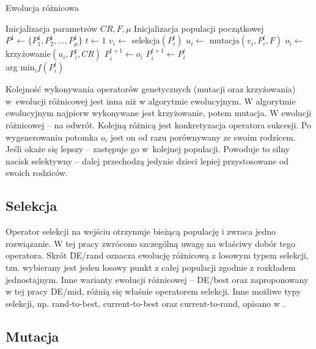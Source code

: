 \documentclass[a4paper,onecolumn,oneside,12pt,wide,floatssmall]{mwrep}
\theoremstyle{definition}
\theoremstyle{plain}%
\theoremstyle{remark}
\begin{document}
\begin{algorithm}[H]
\caption{Ewolucja różnicowa}
\label{algorithm:de}
\begin{algorithmic}[1]
\State Inicjalizacja parametrów $CR, F, \mu$
\State Inicjalizacja populacji początkowej $P^1 \gets \{P^1_1, P^1_2, \ldots, P^1_\mu\}$
\State $t \gets 1$
    \State $v_i \gets$ selekcja$(P^t_i)$
    \State $u_i \gets$ mutacja$(v_i, P^t_i, F)$ 
    \State $o_i \gets$ krzy{\.z}owanie$(u_i, P_i^t, CR)$    
        
      \State $P_i^{t+1} \gets o_i$     
    \Else 
      \State $P_i^{t+1} \gets P_i^{t}$
    \EndIf {}
  \EndFor
\EndWhile \\
\Return arg min$_i f(P^t_i)$ 
\end{algorithmic}
\end{algorithm}

Kolejność wykonywania operatorów genetycznych (mutacji oraz krzyżowania) w~ewolucji różnicowej
jest inna niż w algorytmie ewolucyjnym.
W algorytmie ewolucyjnym najpierw wykonywane jest krzyżowanie, potem mutacja.
W ewolucji różnicowej -- na odwrót.
Kolejną różnicą jest konkretyzacja operatora sukcesji. Po wygenerowaniu potomka
$o_i$ jest on od razu porównywany ze swoim rodzicem. Jeśli okaże się lepszy -- zastępuje go
w~kolejnej populacji. Powoduje to silny nacisk selektywny -- dalej przechodzą jedynie dzieci
lepiej przystosowane od swoich rodziców.

\subsection{Selekcja}

Operator selekcji na wejściu otrzymuje bieżącą populację i zwraca jedno rozwiązanie.
W tej pracy zwrócono szczególną uwagę na właściwy dobór tego operatora.
Skrót DE/rand oznacza ewolucję różnicową z losowym typem selekcji, tzn. wybierany jest jeden
losowy punkt z całej populacji zgodnie z rozkładem jednostajnym.
Inne warianty ewolucji różnicowej -- DE/best oraz zaproponowany w tej pracy DE/mid, 
różnią się właśnie operatorem selekcji. Inne możliwe typy selekcji, 
np. rand-to-best, current-to-best oraz current-to-rand,
opisano w \cite{zaharie}.

\subsection{Mutacja}
\end{document}
